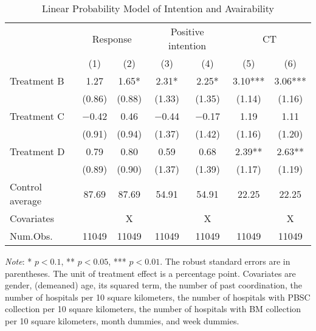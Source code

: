 \documentclass[12pt, a4paper]{article}
\begin{document}
\begin{table}

\caption{\label{tab:stock-reg}Linear Probability Model of Intention and Avairability}
\centering
\fontsize{9}{11}\selectfont
\begin{threeparttable}
\begin{tabular}[t]{lcccccc}
\toprule
\multicolumn{1}{c}{ } & \multicolumn{2}{c}{Response} & \multicolumn{2}{c}{Positive intention} & \multicolumn{2}{c}{CT} \\
\cmidrule(l{3pt}r{3pt}){2-3} \cmidrule(l{3pt}r{3pt}){4-5} \cmidrule(l{3pt}r{3pt}){6-7}
  & (1) & (2) & (3) & (4) & (5) & (6)\\
\midrule
Treatment B & \num{1.27} & \num{1.65}* & \num{2.31}* & \num{2.25}* & \num{3.10}*** & \num{3.06}***\\
 & (\num{0.86}) & (\num{0.88}) & (\num{1.33}) & (\num{1.35}) & (\num{1.14}) & (\num{1.16})\\
Treatment C & \num{-0.42} & \num{0.46} & \num{-0.44} & \num{-0.17} & \num{1.19} & \num{1.11}\\
 & (\num{0.91}) & (\num{0.94}) & (\num{1.37}) & (\num{1.42}) & (\num{1.16}) & (\num{1.20})\\
Treatment D & \num{0.79} & \num{0.80} & \num{0.59} & \num{0.68} & \num{2.39}** & \num{2.63}**\\
 & (\num{0.89}) & (\num{0.90}) & (\num{1.37}) & (\num{1.39}) & (\num{1.17}) & (\num{1.19})\\
\midrule
Control average & 87.69 & 87.69 & 54.91 & 54.91 & 22.25 & 22.25\\
Covariates &  & X &  & X &  & X\\
Num.Obs. & \num{11049} & \num{11049} & \num{11049} & \num{11049} & \num{11049} & \num{11049}\\
\bottomrule
\end{tabular}
\begin{tablenotes}
\item \emph{Note}: * $p < 0.1$, ** $p < 0.05$, *** $p < 0.01$. The robust standard errors are in parentheses. The unit of treatment effect is a percentage point. Covariates are gender, (demeaned) age, its squared term, the number of past coordination, the number of hospitals per 10 square kilometers, the number of hospitals with PBSC collection per 10 square kilometers, the number of hospitals with BM collection per 10 square kilometers, month dummies, and week dummies.
\end{tablenotes}
\end{threeparttable}
\end{table}
\end{document}
